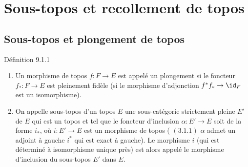 \section{Sous-topos et recollement de
  topos}\pageoriginale

\subsection{Sous-topos et plongement de
  topos}

\begin{enonce*}{Définition 9.1.1}
\begin{enumerate}
\renewcommand{\theenumi}{\alph{enumi}}
\renewcommand{\labelenumi}{\theenumi)}
\item Un morphisme de topos $f:F\rightarrow E$ est appelé un
plongement si le foncteur $f_{\ast}:F\rightarrow E$ est pleinement
fidèle (\ie si le morphisme d'adjonction
$f^{\ast}f_{\ast}\rightarrow \id_F$ est un isomorphisme).

\item On appelle sous-topos d'un topos $E$ une sous-catégorie
strictement pleine $E'$ de $E$ qui est un topos et tel que le
foncteur d'inclusion $\alpha:E'\rightarrow E$ soit de la forme
$i_{\ast}$, où $i:E'\rightarrow E$ est un morphisme de topos (\ie
$(\hyperref[IV.subsubsec3.1.1]{3.1.1})$ $\alpha$ admet un adjoint à gauche
$i^{\ast}$ qui est exact à gauche). Le morphisme $i$ (qui est
déterminé à isomorphisme unique près) est alors appelé
le morphisme
d'inclusion du sous-topos $E'$ dans $E$.
\end{enumerate}
\end{enonce*}

